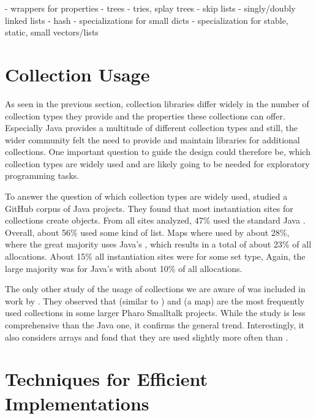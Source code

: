 \documentclass[sigconf, 10pt]{acmart}
\begin{document}
\begin{note}
  - wrappers for properties
  - trees
  - tries, splay trees
  - skip lists
  - singly/doubly linked lists
 - hash
  - specializations for small dicts
  - specialization for stable, static, small vectors/lists
\end{note}

\section{Collection Usage}

As seen in the previous section,
collection libraries differ widely
in the number of collection types they provide
and the properties these collections can offer.
Especially Java provides a multitude of different collection types and still,
the wider community felt the need to provide and maintain libraries
for additional collections.
One important question to guide the design could therefore be,
which collection types are widely used and are likely going to be needed
for exploratory programming tasks.

To answer the question of which collection types are widely used,
\citet{Costa:2017:ESU} studied a GitHub corpus of Java projects\citep{6624029}.
They found that most instantiation sites for collections
create  objects.
From all sites analyzed, 47\% used the standard Java .
Overall, about 56\% used some kind of list.
Maps where used by about 28\%,
where the great majority uses Java's ,
which results in a total of about 23\% of all allocations.
About 15\% all instantiation sites were for some set type,
Again, the large majority was for Java's 
with about 10\% of all allocations.

The only other study of the usage of collections we are aware of
was included in work by \citet[sec. 9.2]{Bergel:2018}.
They observed that  (similar to )
and  (a map) are the most frequently used collections
in some larger Pharo Smalltalk projects.
While the study is less comprehensive than the Java one,
it confirms the general trend.
Interestingly, it also considers arrays
and fond that they are used slightly more often than .


\section{Techniques for Efficient Implementations}
\end{document}
